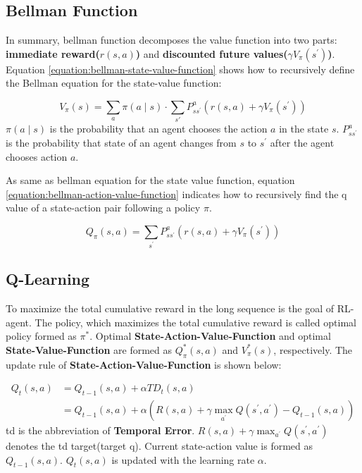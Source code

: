 \subsection{Bellman Function}
In summary, bellman function decomposes the value function into two parts: \textbf{immediate reward($r(s, a)$)} and \textbf{discounted future values($\gamma V_{\pi}\left(s^{\prime}\right)$)}.
Equation \ref{equation:bellman-state-value-function} shows how to recursively define the Bellman equation for the state-value function:

\begin{equation} \label{equation:bellman-state-value-function}
V_{\pi}(s)=\sum_{a} \pi(a \mid s) \cdot \sum_{s \prime} P_{s s^{\prime}}^{a}\left(r(s, a)+\gamma V_{\pi}\left(s^{\prime}\right)\right)
\end{equation}
$\pi(a \mid s)$ is the probability that an agent chooses the action $a$ in the state $s$. $P_{s s^{\prime}}^{a}$ is the probability that state of an agent changes from $s$ to $s^{\prime}$ after the agent chooses action $a$.

As same as bellman equation for the state value function, equation \ref{equation:bellman-action-value-function} indicates how to recursively find the q value of a state-action pair following a policy $\pi$.

\begin{equation} \label{equation:bellman-action-value-function}
Q_{\pi}(s, a)=\sum_{s^{\prime}} P_{s s^{\prime}}^{a}\left(r(s, a)+\gamma V_{\pi}\left(s^{\prime}\right)\right)
\end{equation}

\subsection{Q-Learning}
To maximize the total cumulative reward in the long sequence is the goal of RL-agent. The policy, which maximizes the total cumulative reward is called optimal policy formed as $\pi^*$. Optimal \textbf{State-Action-Value-Function} and optimal \textbf{State-Value-Function} are formed as $Q_\pi^*(s, a)$ and $V_\pi^*(s)$, respectively. The update rule of \textbf{State-Action-Value-Function} is shown below:

\begin{equation}
\begin{aligned}
Q_t(s, a) &= Q_{t-1}(s, a) + \alpha TD_t(s, a) \\
					&= Q_{t-1}(s, a)+\alpha\left(R(s, a)+\gamma \max _{a^{\prime}} Q\left(s^{\prime}, a^{\prime}\right)-Q_{t-1}(s, a)\right)
\end{aligned}
\end{equation}
\gls{td} is the abbreviation of \textbf{Temporal Error}. $R(s, a)+\gamma \max _{a^{\prime}} Q\left(s^{\prime}, a^{\prime}\right)$ denotes the \gls{td} target(target q). Current state-action value is formed as $Q_{t-1}(s, a)$. $Q_t(s, a)$ is updated with the learning rate $\alpha$.


